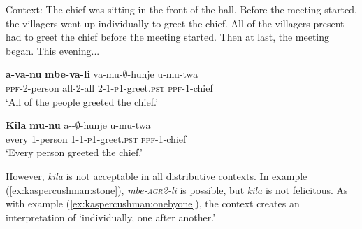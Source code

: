\documentclass[letterpaper, 12pt]{article}
\begin{document}
\begin{exe}

\ex Context: The chief was sitting in the front of the hall.  Before the meeting started, the villagers went up individually to greet the chief. All of the villagers present had to greet the chief before the meeting started. Then at last, the meeting began. This evening... \label{ex:kaspercushman:didgreet}

\begin{xlist}

\ex \gll \textbf{a-va-nu} \textbf{mbe-va-li} va-mu-$\emptyset$-hunje u-mu-twa \\
\textsc{ppf}-2-person all-2-all 2-1-\textsc{p1}-greet.\textsc{pst} \textsc{ppf}-1-chief \\
`All of the people greeted the chief.' \\

\vspace{5mm}

\ex \gll \textbf{Kila} \textbf{mu-nu} a--$\emptyset$-hunje u-mu-twa \\
every 1-person 1-1-\textsc{p1}-greet.\textsc{pst} \textsc{ppf}-1-chief  \\ \label{ex:kaspercushman:everygreeted}
`Every person greeted the chief.' 

\end{xlist}
\end{exe}


However, \textit{kila} is not acceptable in all distributive contexts. In example (\ref{ex:kaspercushman:stone}), \textit{mbe-\textsc{agr2}-li} is possible, but \textit{kila} is not felicitous. As with example (\ref{ex:kaspercushman:onebyone}), the context creates an interpretation of `individually, one after another.'  
\end{document}
